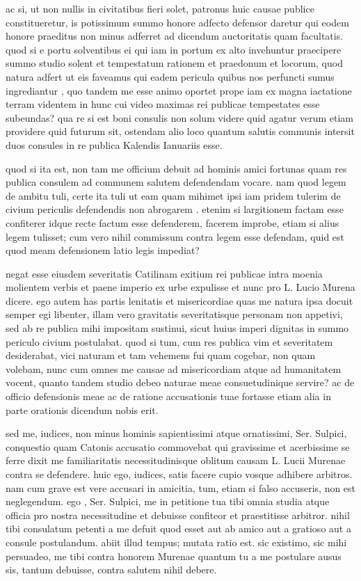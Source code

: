  ac si, ut non nullis in civitatibus fieri solet, patronus huic causae publice constitueretur, is potissimum summo honore adfecto defensor daretur qui eodem honore praeditus non minus adferret ad dicendum auctoritatis quam facultatis. quod si e portu solventibus ei qui iam in portum ex alto invehuntur praecipere summo studio solent et tempestatum rationem et praedonum et locorum, quod natura adfert ut eis faveamus qui eadem pericula quibus nos perfuncti sumus ingrediantur , quo tandem me esse animo oportet prope iam ex magna iactatione terram videntem in hunc cui video maximas rei publicae tempestates esse subeundas? qua re si est boni consulis non solum videre quid agatur verum etiam providere quid futurum sit, ostendam alio loco quantum salutis communis intersit duos consules in re publica Kalendis Ianuariis esse.

 quod si ita est, non tam me officium debuit ad hominis amici fortunas quam res publica consulem ad communem salutem defendendam vocare. nam quod legem de ambitu tuli, certe ita tuli ut eam quam mihimet ipsi iam pridem tulerim de civium periculis defendendis non abrogarem . etenim si largitionem factam esse confiterer idque recte factum esse defenderem, facerem improbe, etiam si alius legem tulisset; cum vero nihil commissum contra legem esse defendam, quid est quod meam defensionem latio legis impediat?

 negat esse eiusdem severitatis Catilinam exitium rei publicae intra moenia molientem verbis et paene imperio ex urbe expulisse et nunc pro L. Lucio Murena dicere. ego autem has partis lenitatis et misericordiae quas me natura ipsa docuit semper egi libenter, illam vero gravitatis severitatisque personam non appetivi, sed ab re publica mihi impositam sustinui, sicut huius imperi dignitas in summo periculo civium postulabat. quod si tum, cum res publica vim et severitatem desiderabat, vici naturam et tam vehemens fui quam cogebar, non quam volebam, nunc cum omnes me causae ad misericordiam atque ad humanitatem vocent, quanto tandem studio debeo naturae meae consuetudinique servire? ac de officio defensionis meae ac de ratione accusationis tuae fortasse etiam alia in parte orationis dicendum nobis erit.

 sed me, iudices, non minus hominis sapientissimi atque ornatissimi, Ser. Sulpici, conquestio quam Catonis accusatio commovebat qui gravissime et acerbissime se ferre dixit me familiaritatis necessitudinisque oblitum causam L. Lucii Murenae contra se defendere. huic ego, iudices, satis facere cupio vosque adhibere arbitros. nam cum grave est vere accusari in amicitia, tum, etiam si falso accuseris, non est neglegendum. ego , Ser. Sulpici, me in petitione tua tibi omnia studia atque officia pro nostra necessitudine et debuisse confiteor et praestitisse arbitror. nihil tibi consulatum petenti a me defuit quod esset aut ab amico aut a gratioso aut a consule postulandum. abiit illud tempus; mutata ratio est. sic existimo, sic mihi persuadeo, me tibi contra honorem Murenae quantum tu a me postulare ausus sis, tantum debuisse, contra salutem nihil debere.

